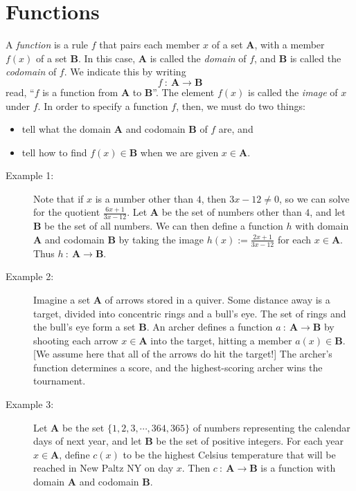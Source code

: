 \documentclass{article}
\newcommand\A{\mathbf A}
\newcommand\B{\mathbf B}
\newcommand{\0}{\mathbf 0}
\newcommand{\1}{\mathbf 1}
\begin{document}
\section{Functions}


A \emph{function} is a rule $f$ that pairs each member $x$ of a set $\A$, with a member $f(x)$ of a set $\B$. In this case, $\A$ is called the \emph{domain} of $f$, and $\B$ is called the \emph{codomain} of $f$. We indicate this by writing
\begin{equation*}
f\ :\ \A \to \B
\end{equation*}
read, ``$f$ is a function from $\A$ to $\B$''. The element $f(x)$ is called the \emph{image} of $x$ under $f$. In order to specify a function $f$, then, we must do two things:
\begin{itemize}
  \item tell what the domain $\A$ and codomain $\B$ of $f$ are, and
  \item tell how to find $f(x) \in \B$ when we are given $x \in \A$.
\end{itemize}

\begin{description}
  \item[Example 1:] Note that if $x$ is a number other than $4$, then $3x-12 \neq 0$, so we can solve for the quotient $\frac{6x+1}{3x-12}$. Let $\A$ be the set of numbers other than $4$, and let $\B$ be the set of all numbers. We can then define a function $h$ with domain $\A$ and codomain $\B$ by taking the image $h(x) := \frac{2x+1}{3x-12}$ for each $x \in \A$. Thus $h\ :\ \A \to \B$.

  \item[Example 2:] Imagine a set $\A$ of arrows stored in a quiver. Some distance away is a target, divided into concentric rings and a bull's eye. The set of rings and the bull's eye form a set $\B$. An archer defines a function $a\ :\ \A \to \B$ by shooting each arrow $x \in \A$ into the target, hitting a member $a(x) \in \B$. [We assume here that all of the arrows do hit the target!] The archer's function determines a score, and the highest-scoring archer wins the tournament.

  \item[Example 3:] Let $\A$ be the set $\{1,2,3,\cdots,364,365\}$ of numbers representing the calendar days of next year, and let $\B$ be the set of positive integers. For each year $x \in \A$, define $c(x)$ to be the highest Celsius temperature that will be reached in New Paltz NY on day $x$. Then $c\ :\ \A \to \B$ is a function with domain $\A$ and codomain $\B$.
\end{description}
\end{document}
